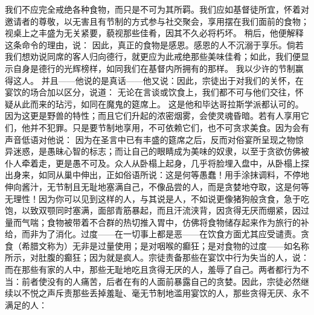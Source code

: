 我们不应完全戒绝各种食物，而只是不可为其所羁。我们应如基督徒所宜，怀着对邀请者的尊敬，以无害且有节制的方式参与社交聚会，享用摆在我们面前的食物；视桌上之丰盛为无关紧要，藐视那些佳肴，因其不久必将朽坏。 稍后，他便解释这条命令的理由，说： 因此，真正的食物是感恩。感恩的人不沉溺于享乐。倘若我们想劝说同席的客人归向德行，就更应为此戒绝那些美味佳肴；如此，我们便显示自身是德行的光辉榜样，如同我们在基督内所拥有的那样。 我以少许的节制赢得这人。 并且——他说的是真话——他又说：因此，宗徒出于对我们的关怀，在宴饮的场合加以区分，说道： 无论在言谈或饮食上，我们都不可与他们交往，怀疑从此而来的玷污，如同在魔鬼的筵席上。 这是他和毕达哥拉斯学派都认可的。因为这更是野兽的特性；而且它们升起的浓密烟雾，会使灵魂昏暗。若有人享用它们，他并不犯罪。只是要节制地享用，不可依赖它们，也不可贪求美食。因为会有声音低语对他说： 因为在圣言中已有丰盛的筵席之后，反而对俗宴所呈现之物惊异迷惑，是愚昧心智的标志；而让自己的眼睛成为美味的奴隶，以至于贪欲仿佛被仆人牵着走，更是愚不可及。众人从卧榻上起身，几乎将脸埋入盘中，从卧榻上探出身来，如同从巢中伸出，正如俗语所说：这是何等愚蠢！用手涂抹调料，不停地伸向酱汁，无节制且无耻地塞满自己，不像品尝的人，而是贪婪地夺取，这是何等无理性！因为你可以见到这样的人，与其说是人，不如说更像猪狗般贪食，急于吃饱，以致双颚同时塞满，面部青筋暴起，而且汗流浃背，因贪得无厌而绷紧，因过量而气喘；食物被带着不合群的热切推入胃中，仿佛将食物储存起来作为旅行的补给，而非为了消化。过度——在一切事上都是恶——在饮食方面尤其应受谴责。贪食（希腊文称为）无非是过量使用；是对咽喉的癫狂；是对食物的过度——如名称所示，对肚腹的癫狂；因为就是疯人。宗徒责备那些在宴饮中行为失当的人，说： 而在那些有家的人中，那些无耻地吃且贪得无厌的人，羞辱了自己。两者都行为不当：前者使没有的人痛苦，后者在有的人面前暴露自己的贪婪。因此，宗徒必然继续以不悦之声斥责那些丢掉羞耻、毫无节制地滥用宴饮的人，那些贪得无厌、永不满足的人：\par

